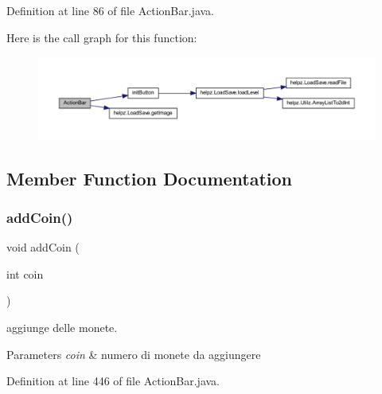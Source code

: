 Definition at line 86 of file Action\+Bar.\+java.

Here is the call graph for this function\+:
\nopagebreak
\begin{figure}[H]
\begin{center}
\leavevmode
\includegraphics[width=350pt]{classui_1_1_action_bar_a4ff9099a9e2976f76bc6d0e2e5041cc6_cgraph}
\end{center}
\end{figure}


\subsection{Member Function Documentation}
\mbox{\label{classui_1_1_action_bar_a8e9e4227428708da489e0b37223377a8}} 
\subsubsection{\texorpdfstring{add\+Coin()}{addCoin()}}
{\footnotesize\ttfamily void add\+Coin (\begin{DoxyParamCaption}\item[{int}]{coin }\end{DoxyParamCaption})}



aggiunge delle monete. 


\begin{DoxyParams}{Parameters}
{\em coin} & numero di monete da aggiungere \\
\hline
\end{DoxyParams}


Definition at line 446 of file Action\+Bar.\+java.


